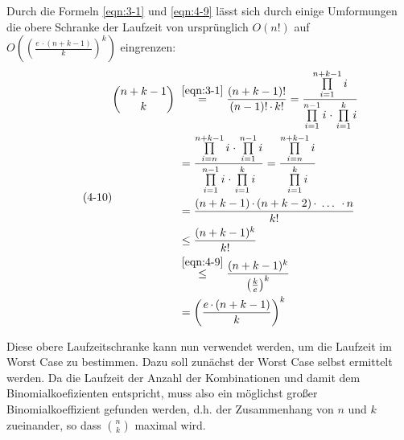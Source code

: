 Durch die Formeln \eqref{eqn:3-1} und \eqref{eqn:4-9} lässt sich durch einige Umformungen die obere Schranke der Laufzeit von ursprünglich $ O(n!) $  auf $ O\left( \left( \frac{e \, \cdotp (n + k - 1)}{k}\right)^k\right) $ eingrenzen:
\begin{equation} \label{eqn:4-10}
\tag{4-10}
\begin{aligned}
\binom{n + k - 1}{k} &\ {} \overset{\eqref{eqn:3-1}}{=}  \frac{(n+k-1)!}{(n-1)!\, \cdotp k!} = \frac{\prod\limits_{i=1}^{n+k-1}i}{\prod\limits_{i=1}^{n-1}i \; \cdotp \, \prod\limits_{i=1}^{k}i}  \\
&\ = \frac{\prod\limits_{i=n}^{n+k-1}i \; \cdotp \, \prod\limits_{i=1}^{n-1}i}{\prod\limits_{i=1}^{n-1}i \; \cdotp \, \prod\limits_{i=1}^{k}i} = \frac{\prod\limits_{i=n}^{n+k-1}i}{\prod\limits_{i=1}^{k}i}\\
&\ = \frac{(n + k - 1) \, \cdotp (n + k - 2)\, \cdotp \; \dots \; \, \cdotp n}{k!} \\
&\ \leq \frac{(n + k - 1)^k}{k!} \\
&\ \overset{\eqref{eqn:4-9}}{\leq} \frac{(n + k - 1)^k}{\left( \frac{k}{e} \right) ^k} \\
&\ = \left( \frac{e \, \cdotp (n + k - 1)}{k}\right)^k  \\
\end{aligned}
\end{equation} 

Diese obere Laufzeitschranke kann nun verwendet werden, um die Laufzeit im Worst Case zu bestimmen. Dazu soll zunächst der Worst Case selbst ermittelt werden. Da die Laufzeit der Anzahl der Kombinationen und damit dem Binomialkoefizienten entspricht, muss also ein möglichst großer Binomialkoeffizient gefunden werden, d.h. der Zusammenhang von $n$ und $k$ zueinander, so dass $\binom{n}{k}$ maximal wird.\\

